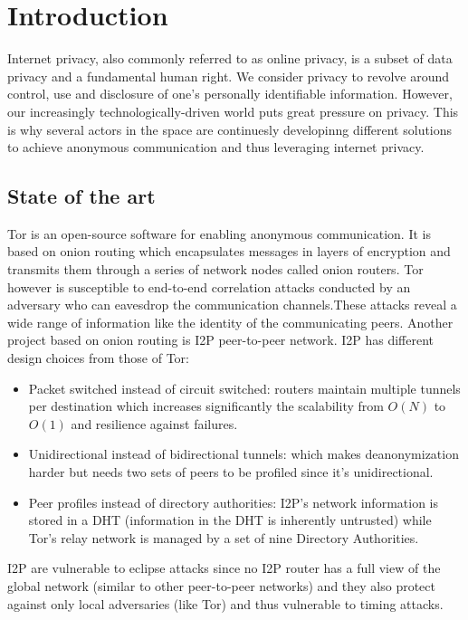 
\begin{abstract}

\end{abstract}
\section{Introduction}
Internet privacy, also commonly referred to as online privacy, is a subset of data privacy and a fundamental human right. We consider privacy to revolve around control, use and disclosure of one’s personally identifiable information.
However, our increasingly technologically-driven world puts great pressure on privacy. 
This is why several actors in the space are continuesly developinng different solutions to achieve anonymous communication and thus leveraging internet privacy.


\subsection*{State of the art}
Tor is an open-source software for enabling anonymous communication. It is based on onion routing which encapsulates messages in layers of encryption and transmits them through a series of network nodes called onion routers. Tor however is susceptible to end-to-end correlation attacks conducted by an adversary who can eavesdrop the communication channels.These attacks reveal a wide range of information like the identity of the communicating peers.
Another project based on onion routing is I2P peer-to-peer network. I2P has different design choices from those of Tor:
\begin{itemize}
    \item Packet switched instead of circuit switched: routers maintain multiple tunnels per destination which increases significantly the scalability from $O(N)$ to $O(1)$ and resilience against failures.
    \item Unidirectional instead of bidirectional tunnels: which makes deanonymization harder but needs two sets of peers to be profiled since it's unidirectional.
    \item Peer profiles instead of directory authorities: I2P’s network information is stored in a DHT (information in the DHT is inherently untrusted) while Tor’s relay network is managed by a set of nine Directory Authorities.

\end{itemize}
I2P are vulnerable to eclipse attacks since no I2P router has a full view of the global network (similar to other peer-to-peer networks) and they also protect against only local adversaries (like Tor) and thus vulnerable to timing attacks.
